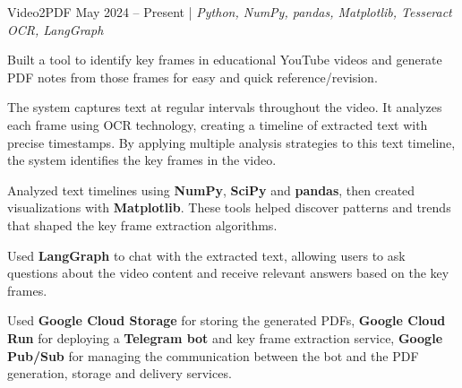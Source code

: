 \resumeSubheadings
{Video2PDF }
{May 2024 -- Present}
{}{}{| \textit{Python, NumPy, pandas, Matplotlib, Tesseract OCR, LangGraph}}
\resumeItemListStart
\item Built a tool to identify key frames in educational YouTube videos and generate PDF notes from those frames for easy and quick reference/revision.
\item The system captures text at regular intervals throughout the video. It analyzes each frame using OCR technology, creating a timeline of extracted text with precise timestamps. By applying multiple analysis strategies to this text timeline, the system identifies the key frames in the video.
\item Analyzed text timelines using \textbf{NumPy}, \textbf{SciPy} and \textbf{pandas}, then created visualizations with \textbf{Matplotlib}. These tools helped discover patterns and trends that shaped the key frame extraction algorithms.
\item Used \textbf{LangGraph} to chat with the extracted text, allowing users to ask questions about the video content and receive relevant answers based on the key frames.
\item Used \textbf{Google Cloud Storage} for storing the generated PDFs, \textbf{Google Cloud Run} for deploying a \textbf{Telegram bot} and key frame extraction service, \textbf{Google Pub/Sub} for managing the communication between the bot and the PDF generation, storage and delivery services.
\resumeItemListEnd